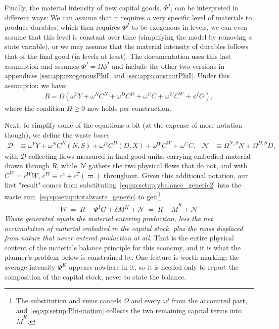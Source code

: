 Finally, the material intensity of new capital goods, $\Phi^I$, can be interpreted in different ways: We can assume that it requires a very specific level of materials to produce durables, which then requires $\Phi^I$ to be exogenous in levels, we can even assume that this level is constant over time (simplifying the model by removing a state variable), or we may assume that the material intensity of durables follows that of the final good (in levels at least). The documentation uses this last assumption and assumes $\Phi^I = \Omega \phi^I$ and include the other two versions in appendices \ref{sec:app:exogenousPhiI} and \ref{sec:app:constantPhiI}. Under this assumption we have:
\begin{align}
    R =  \Omega \left(\omega^Y Y + \omega^{N}C^N + \omega^{D}C^D + \omega^C C + \omega^W C^W+\phi^I G\right) \label{eq:sp:setup:ybalance_OmegaPhi},
\end{align}
where the condition $\Omega\geq0$ now holds per construction.

Next, to simplify some of the equations a bit (at the expense of more notation though), we define the waste bases
\begin{align}
    \mathcal D &\equiv \omega^YY+\omega^{N}C^N(N,S)+\omega^{D}C^D(D,X)+\omega^WC^W+\omega^CC,
&
\mathcal N &\equiv \Omega^{N,S}N+\Omega^{D,S}D,
\label{eq:sp:setup:base}
\end{align}
with $\mathcal D$ collecting flows measured in final-good units, carrying embodied material drawn through $R$, while $\mathcal N$ gathers the two physical flows that do not, and with $C^W=c^WW$, $c^W\equiv c^c+c^T(\varpi)$ throughout. Given this additional notation, our first "result" comes from substituting~\eqref{eq:sp:setup:ybalance_generic2} into the waste sum~\eqref{eq:sp:setup:totalwaste_generic} to get:\footnote{The substitution and sums cancels $\Omega$ and every $\omega^j$ from the accounted part, and~\eqref{eq:sp:setup:Phi-motion} collects the two remaining capital terms into $\dot M^K$.}
\begin{align}
\boxed{\;W \;=\; R-\Phi^IG+\delta M^K+\mathcal N \;=\; R-\dot M^K+\mathcal N\;}
\label{eq:sp:setup:ledger}
\end{align}
\emph{Waste generated equals the material entering production, less the net accumulation of material embodied in the capital stock, plus the mass displaced from nature that never entered production at all.} That is the entire physical content of the materials balance principle for this economy, and it is what the planner's problem below is constrained by. One feature is worth marking: the average intensity $\Phi^K$ appears nowhere in it, so it is needed only to report the composition of the capital stock, never to state the balance.


